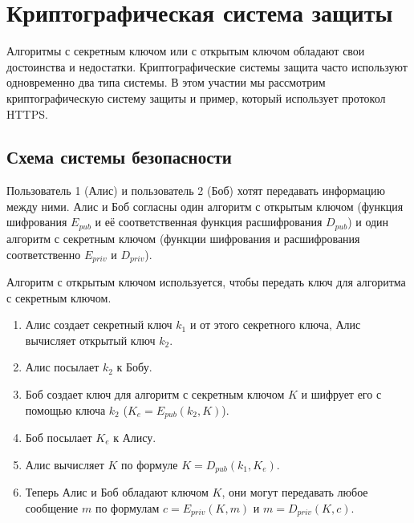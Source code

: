 \section{Криптографическая система защиты}
Алгоритмы с секретным ключом или с открытым ключом обладают свои достоинства и недостатки. Криптографические системы защита часто используют одновременно два типа системы. В этом участии мы рассмотрим криптографическую систему защиты и пример, который использует протокол HTTPS.

\subsection{Схема системы безопасности}

Пользователь 1 (Алис) и пользователь 2 (Боб) хотят передавать информацию между ними. Алис и Боб согласны один алгоритм с открытым ключом (функция шифрования $E_{pub}$ и её соответственная функция расшифрования $D_{pub}$) и один алгоритм с секретным ключом (функции шифрования и расшифрования соответственно $E_{priv}$ и $D_{priv}$). 

Алгоритм с открытым ключом используется, чтобы передать ключ для алгоритма с секретным ключом.

\begin{enumerate}
	\item Алис создает секретный ключ $k_1$ и от этого секретного ключа, Алис вычисляет открытый ключ $k_2$.
	\item Алис посылает $k_2$ к Бобу.
	\item Боб создает ключ для алгоритм с секретным ключом $K$ и шифрует его с помощью ключа $k_2$ ($K_e=E_{pub}(k_2, K)$).
	\item Боб посылает $K_e$ к Алису.
	\item Алис вычисляет $K$ по формуле $K = D_{pub}(k_1, K_e)$.
	\item Теперь Алис и Боб обладают ключом $K$, они могут передавать любое сообщение $m$ по формулам $c=E_{priv}(K, m)$ и $m=D_{priv}(K, c)$. 
\end{enumerate}
	
